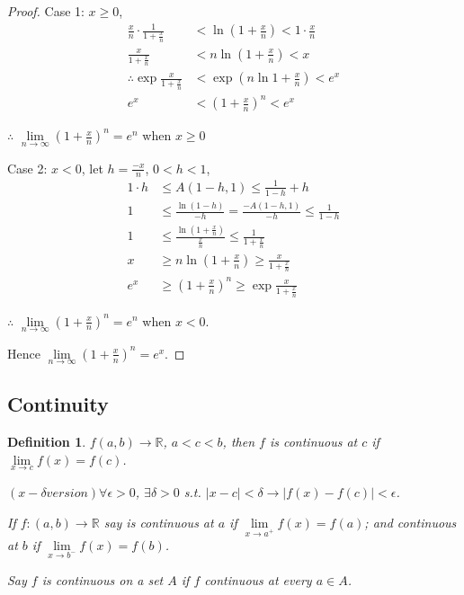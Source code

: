 \documentclass[12pt]{article}
\newcommand{\abs}[1]{\left| #1 \right|}
\theoremstyle{plain}
\newtheorem{definition}{Definition}[subsection]
\newcommand{\dlim}{\displaystyle\lim\limits}
\begin{document}
    \begin{proof}
        Case 1: $x\geq 0$, 
        \begin{align*}
            \frac xn \cdot \frac1{1+\frac xn}&<\ln (1+\frac xn)
            <1 \cdot \frac xn \\ 
            \frac{x}{1+\frac xn}&<n \ln (1+\frac xn)<x\\
            \therefore \exp \frac{x}{1+\frac xn}&<\exp (n\ln 1+\frac xn)<e^x\\
            e^x&<(1+\frac xn)^n < e^x
        \end{align*}
        \begin{center}
            $\therefore\,\, \dlim_{n\to\infty} (1+\frac xn)^n = e^n$ when $x\geq 0$
        \end{center}
        Case 2: $x< 0$, let $h = \frac{-x}n$, $0<h<1$, 
        \begin{align*}
            1\cdot h &\leq A(1-h, 1)\leq \frac1{1-h} + h\\
            1&\leq \frac{\ln (1-h)}{-h}=\frac{-A(1-h,1)}{-h}\leq \frac 1{1-h}\\
            1&\leq \frac{\ln (1+\frac xn)}{\frac xn}\leq \frac1{1+\frac xn}\\
            x&\geq n\ln(1+\frac xn)\geq \frac x{1+\frac xn}\\
            e^x&\geq (1+\frac xn)^n \geq \exp\frac x{1+\frac xn}
        \end{align*}
        \begin{center}
            $\therefore\,\, \dlim_{n\to\infty} (1+\frac xn)^n = e^n$ when $x<0$.
         \end{center}
         
        Hence $\dlim_{n\to\infty} (1+\frac xn)^n = e^x$.
    \end{proof}

    \vspace{1.5 in}

    \newpage
    \subsection{Continuity}
    \begin{definition}
        $f(a,b) \to\mathbb{R}$, $a<c<b$, then $f$ is continuous at $c$
        if $\dlim_{x\to c} f(x) =f(c)$.

        $(x-\delta version) \forall \epsilon>0$, $\exists \delta >0$ s.t. 
        $\abs{x-c}<\delta \to \abs{f(x)-f(c)}<\epsilon$.
        
        If $f:(a,b)\to\mathbb{R}$ say is continuous at $a$
        if $\dlim_{x\to a^+} f(x) = f(a)$; and continuous at
        $b$ if $\dlim_{x\to b^-}f(x) =f(b)$.

        Say $f$ is continuous on a set $A$ if $f$ continuous at every $a\in A$.\\
    \end{definition}
\end{document}
